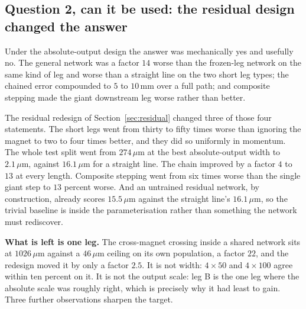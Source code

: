 \documentclass[11pt,a4paper]{article}
\newcommand{\um}{\ensuremath{\,\mu\mathrm{m}}}
\newcommand{\mm}{\ensuremath{\,\mathrm{mm}}}
\begin{document}
\subsection{Question 2, can it be used: the residual design changed the answer}

Under the absolute-output design the answer was mechanically yes and usefully
no. The general network was a factor $14$ worse than the frozen-leg network on
the same kind of leg and worse than a straight line on the two short leg types;
the chained error compounded to $5$ to $10\mm$ over a full path; and composite
stepping made the giant downstream leg worse rather than better.

The residual redesign of Section~\ref{sec:residual} changed three of those four
statements. The short legs went from thirty to fifty times worse than ignoring
the magnet to two to four times better, and they did so uniformly in momentum.
The whole test split went from $274\um$ at the best absolute-output width to
$2.1\um$, against $16.1\um$ for a straight line. The chain improved by a factor
$4$ to $13$ at every length. Composite stepping went from six times worse than
the single giant step to $13$ percent worse. And an untrained residual network,
by construction, already scores $15.5\um$ against the straight line's $16.1\um$,
so the trivial baseline is inside the parameterisation rather than something the
network must rediscover.

\textbf{What is left is one leg.} The cross-magnet crossing inside a shared
network sits at $1026\um$ against a $46\um$ ceiling on its own population, a
factor $22$, and the redesign moved it by only a factor $2.5$. It is not width:
$4 \times 50$ and $4 \times 100$ agree within ten percent on it. It is not the
output scale: leg B is the one leg where the absolute scale was roughly right,
which is precisely why it had least to gain. Three further observations sharpen
the target.
\end{document}
